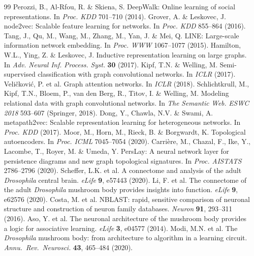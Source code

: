 \documentclass[10pt]{article}
\begin{document}
\begin{thebibliography}{99}
 Perozzi, B., Al-Rfou, R. \& Skiena, S. DeepWalk: Online learning of social representations. In \textit{Proc. KDD} 701--710 (2014).
 Grover, A. \& Leskovec, J. node2vec: Scalable feature learning for networks. In \textit{Proc. KDD} 855--864 (2016).
 Tang, J., Qu, M., Wang, M., Zhang, M., Yan, J. \& Mei, Q. LINE: Large-scale information network embedding. In \textit{Proc. WWW} 1067--1077 (2015).
 Hamilton, W.L., Ying, Z. \& Leskovec, J. Inductive representation learning on large graphs. In \textit{Adv. Neural Inf. Process. Syst.} \textbf{30} (2017).
 Kipf, T.N. \& Welling, M. Semi-supervised classification with graph convolutional networks. In \textit{ICLR} (2017).
 Veli\v{c}kovi\'c, P. et al. Graph attention networks. In \textit{ICLR} (2018).
 Schlichtkrull, M., Kipf, T.N., Bloem, P., van den Berg, R., Titov, I. \& Welling, M. Modeling relational data with graph convolutional networks. In \textit{The Semantic Web. ESWC 2018} 593--607 (Springer, 2018).
 Dong, Y., Chawla, N.V. \& Swami, A. metapath2vec: Scalable representation learning for heterogeneous networks. In \textit{Proc. KDD} (2017).
 Moor, M., Horn, M., Rieck, B. \& Borgwardt, K. Topological autoencoders. In \textit{Proc. ICML} 7045--7054 (2020).
 Carri\`ere, M., Chazal, F., Ike, Y., Lacombe, T., Royer, M. \& Umeda, Y. PersLay: A neural network layer for persistence diagrams and new graph topological signatures. In \textit{Proc. AISTATS} 2786--2796 (2020).
 Scheffer, L.K. et al. A connectome and analysis of the adult \textit{Drosophila} central brain. \textit{eLife} \textbf{9}, e57443 (2020).
 Li, F. et al. The connectome of the adult \textit{Drosophila} mushroom body provides insights into function. \textit{eLife} \textbf{9}, e62576 (2020).
 Costa, M. et al. NBLAST: rapid, sensitive comparison of neuronal structure and construction of neuron family databases. \textit{Neuron} \textbf{91}, 293--311 (2016).
 Aso, Y. et al. The neuronal architecture of the mushroom body provides a logic for associative learning. \textit{eLife} \textbf{3}, e04577 (2014).
 Modi, M.N. et al. The \textit{Drosophila} mushroom body: from architecture to algorithm in a learning circuit. \textit{Annu.\ Rev.\ Neurosci.} \textbf{43}, 465--484 (2020).

\end{thebibliography}
\end{document}
